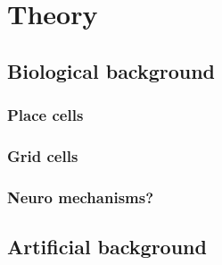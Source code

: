 \section{Theory}\label{sec:theory}

\subsection{Biological background}\label{ssec:biological_background}
\subsubsection{Place cells}\label{sssec:place_cells}
\subsubsection{Grid cells}\label{sssec:grid_cells}
\subsubsection{Neuro mechanisms?}\label{sssec:neuro_mechanisms}

\subsection{Artificial background}\label{ssec:artificial_background}